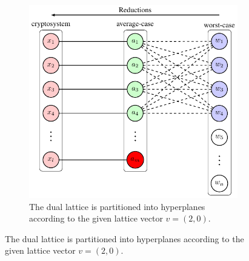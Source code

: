 \documentclass[../main.tex]{subfiles}
\begin{document}
\begin{figure}[hbt!]
	\centering
	\begin{subfigure}[b]{0.95\textwidth}
		\centering
    	\includegraphics[page=5]{images/Lattice_crypto_tikz_folder.pdf}
		\caption{The dual lattice is partitioned into hyperplanes according to the given lattice vector $v=(2,0)$.}
		\label{subfig:dualLatHypExp1}
	\end{subfigure}
	

\end{figure}
\end{document}
